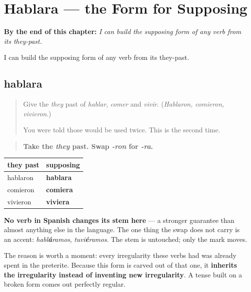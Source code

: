 
\chapter{Hablara --- the Form for Supposing}
\label{ch:hablara}

\begin{chapteropening}
\textbf{By the end of this chapter:} \emph{I can build the supposing form of any verb from its they-past.}

I can build the supposing form of any verb from its they-past.
\end{chapteropening}

\section[hablara]{hablara}

\label{lesson:ES-C56-hablara}



\begin{quote}
Give the \emph{they} past of \emph{hablar}, \emph{comer} and \emph{vivir}. (\emph{Hablaron, comieron, vivieron}.)

You were told those would be used twice. This is the second time.
\end{quote}

\begin{grammarlens}[title={Grammar Lens: swap the ending}]
\begin{quote}
\textbf{Take the \emph{they} past. Swap \emph{-ron} for \emph{-ra}.}
\end{quote}

\noindent
\begin{tabularx}{\linewidth}{@{}>{\raggedright\arraybackslash}X>{\raggedright\arraybackslash}X@{}}
\toprule
\textbf{they past} & \textbf{supposing} \\
\midrule
hablaron & \textbf{hablara} \\
comieron & \textbf{comiera} \\
vivieron & \textbf{viviera} \\
\bottomrule
\end{tabularx}

\textbf{No verb in Spanish changes its stem here} — a stronger guarantee than almost anything else in the language. The one thing the swap does not carry is an accent: \emph{habl\textbf{á}ramos}, \emph{tuvi\textbf{é}ramos}. The stem is untouched; only the mark moves.

The reason is worth a moment: every irregularity these verbs had was already spent in the preterite. Because this form is carved out of that one, it \textbf{inherits the irregularity instead of inventing new irregularity}. A tense built on a broken form comes out perfectly regular.
\end{grammarlens}


